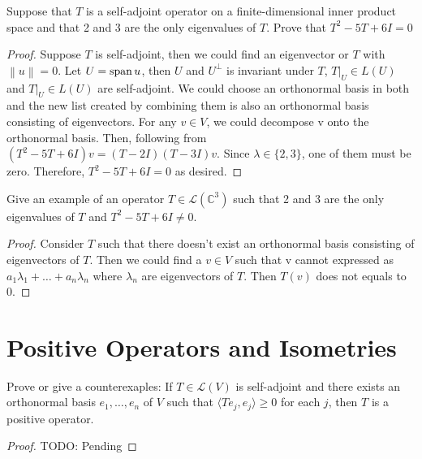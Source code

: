 \begin{exercise}
  Suppose that $T$ is a self-adjoint operator on a finite-dimensional
  inner product space and that 2 and 3 are the only eigenvalues of $T$.
  Prove that $T^2 - 5T + 6I = 0$
\end{exercise}

\begin{proof}
  Suppose $T$ is self-adjoint, then we could find an eigenvector or $T$
  with $\left\| u \right\| = 0$. Let $U = \mathop{\mathrm{span}} u$, then $U$ and $U^\perp$ is invariant under $T$,
  $T|_U \in L(U)$ and $T|_U \in L(U)$ are self-adjoint. We could choose an
  orthonormal basis in both and the new list created by combining them 
  is also an orthonormal basis consisting of eigenvectors. For any
  $v \in V$, we could decompose v onto the orthonormal basis.
  Then, following from $(T^2 -5T + 6I)v = (T-2I)(T-3I)v$. Since $\lambda \in \{2, 3\}$,
  one of them must be zero. Therefore, $T^2 - 5T + 6I = 0$ as desired.
\end{proof}

\begin{exercise}
  Give an example of an operator $T \in \mathcal{L}(\mathbb{C}^3)$ such that 2 and 3
  are the only eigenvalues of $T$ and $T^2 -5T + 6I \neq 0$.
\end{exercise}

\begin{proof}
  Consider $T$ such that there doesn't exist an orthonormal basis consisting
  of eigenvectors of $T$. Then we could find a $v \in V$ such that v cannot expressed
  as $a_1 \lambda_1 + \dots + a_n \lambda_n$ where $\lambda_n$ are eigenvectors of $T$. Then $T(v)$ does not 
  equals to 0.
\end{proof}

\section{Positive Operators and Isometries}

\begin{exercise}
  Prove or give a counterexaples: If $T \in \mathcal{L}(V)$ is self-adjoint
  and there exists an orthonormal basis $e_1, \dots,e_n $ of $V$ such that 
  $\langle Te_j , e_j \rangle \geq 0$ for each $j$, then $T$ is a positive operator.
\end{exercise}

\begin{proof}
  TODO: Pending
\end{proof}

